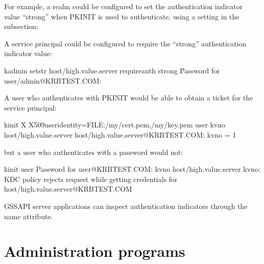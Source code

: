 \documentclass[letterpaper,10pt,english]{sphinxmanual}
\begin{document}
\sphinxAtStartPar
For example, a realm could be configured to set the authentication
indicator value “strong” when PKINIT is used to authenticate, using a
setting in the {\hyperref[\detokenize{admin/conf_files/kdc_conf:kdc-realms}]{}} subsection:

\begin{sphinxVerbatim}[commandchars=\\\{\}]
  
\end{sphinxVerbatim}

\sphinxAtStartPar
A service principal could be configured to require the “strong”
authentication indicator value:

\begin{sphinxVerbatim}[commandchars=\\\{\}]
\PYGZdl{} kadmin setstr host/high.value.server require\PYGZus{}auth strong
Password for user/admin@KRBTEST.COM:
\end{sphinxVerbatim}

\sphinxAtStartPar
A user who authenticates with PKINIT would be able to obtain a ticket
for the service principal:

\begin{sphinxVerbatim}[commandchars=\\\{\}]
\PYGZdl{} kinit \PYGZhy{}X X509\PYGZus{}user\PYGZus{}identity=FILE:/my/cert.pem,/my/key.pem user
\PYGZdl{} kvno host/high.value.server
host/high.value.server@KRBTEST.COM: kvno = 1
\end{sphinxVerbatim}

\sphinxAtStartPar
but a user who authenticates with a password would not:

\begin{sphinxVerbatim}[commandchars=\\\{\}]
\PYGZdl{} kinit user
Password for user@KRBTEST.COM:
\PYGZdl{} kvno host/high.value.server
kvno: KDC policy rejects request while getting credentials for
  host/high.value.server@KRBTEST.COM
\end{sphinxVerbatim}

\sphinxAtStartPar
GSSAPI server applications can inspect authentication indicators
through the  name
attribute.


\chapter{Administration  programs}
\label{\detokenize{admin/admin_commands/index:administration-programs}}\label{\detokenize{admin/admin_commands/index::doc}}
\end{document}
